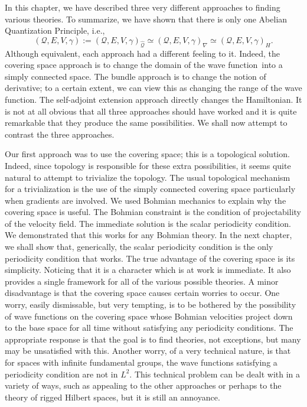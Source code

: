 \documentclass[11pt]{article}
\theoremstyle{remark}
\begin{document}
In this chapter, we have described three very different approaches to
finding various theories. To summarize, we have shown that there is
only one Abelian Quantization Principle, i.e., 
\[
(\ensuremath{\mathcal{Q}}, E, V, \ensuremath{\gamma}) 
\ensuremath{:=} (\ensuremath{\mathcal{Q}}, E, V, \gamma)_{\ensuremath{\widehat{\ensuremath{\mathcal{Q}}}}} 
\ensuremath{\simeq} (\ensuremath{\mathcal{Q}}, E, V, \gamma)_{\nabla} 
\ensuremath{\simeq} (\ensuremath{\mathcal{Q}}, E, V, \gamma)_{H}.
\] 
Although equivalent,  each approach had a different feeling to
it. Indeed, the covering space approach is to change the domain of
the wave function\ into a simply connected space. The bundle approach is to change the
notion of derivative; to a certain extent, we can view this as
changing the range of the wave function. 
The self-adjoint extension
approach directly  
changes the Hamiltonian. It is not at all obvious that all
three approaches should have worked and it is quite remarkable 
 that they produce the same
possibilities. We shall now attempt to contrast the three
approaches. 


Our first approach was to use the covering space; this 
 is a topological solution. Indeed, since 
topology is responsible for these extra possibilities, it seems quite
natural to attempt to trivialize the topology. The usual
topological mechanism for  a trivialization is the use of the 
 simply connected covering space particularly when gradients are involved. 
 We used Bohmian mechanics to explain why the
covering space is useful. The Bohmian constraint is the condition of
projectability of the velocity field. The immediate solution
 is the scalar periodicity condition. We demonstrated that this works
 for any Bohmian theory. In the next chapter, we shall show that,
 generically, the scalar periodicity 
 condition is the only periodicity condition that works.
The true advantage of the covering space is its simplicity. Noticing
 that it is a character which is at work is immediate. It also 
provides a single framework for all of the various
 possible theories.
 A minor disadvantage is that the covering space causes certain
 worries to occur. One worry, easily dismissable, but very
 tempting, is to be bothered by the possibility of 
  wave functions  on the covering space 
 whose Bohmian velocities project down to the base
 space for all time without satisfying any periodicity conditions.
The appropriate response is that the goal is to find theories, not
 exceptions, but many may be unsatisfied with this. Another worry, of
 a very technical nature, is that for spaces with infinite fundamental
 groups, the wave functions satisfying a periodicity condition are not in
 \ensuremath{L^{2}}. This technical problem can be dealt with in a variety of ways,
 such as appealing to the other approaches or perhaps to the theory of
 rigged Hilbert spaces, 
 but it is still an annoyance. 
\end{document}
